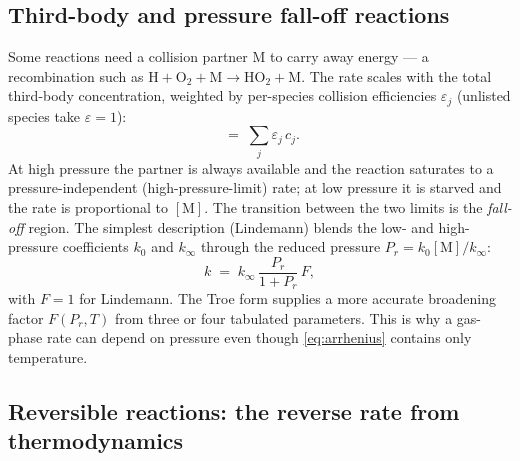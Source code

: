 \documentclass[11pt,a4paper]{article}
\begin{document}
\subsection{Third-body and pressure fall-off reactions}

Some reactions need a collision partner $\mathrm{M}$ to carry away
energy --- a recombination such as $\mathrm{H + O_2 + M \rightarrow HO_2 + M}$.  The
rate scales with the total third-body concentration, weighted by
per-species collision efficiencies $\varepsilon_j$ (unlisted species
take $\varepsilon = 1$):
\begin{equation}
    [\mathrm{M}] \;=\; \sum_j \varepsilon_j\, c_j .
    \label{eq:third-body}
\end{equation}
At high pressure the partner is always available and the reaction
saturates to a pressure-independent (high-pressure-limit) rate; at low
pressure it is starved and the rate is proportional to $[\mathrm{M}]$.
The transition between the two limits is the \emph{fall-off} region.
The simplest description (Lindemann) blends the low- and
high-pressure coefficients $k_0$ and $k_\infty$ through the reduced
pressure $P_r = k_0[\mathrm{M}]/k_\infty$:
\begin{equation}
    k \;=\; k_\infty \,\frac{P_r}{1 + P_r}\, F,
    \label{eq:falloff}
\end{equation}
with $F = 1$ for Lindemann.  The Troe form supplies a more accurate
broadening factor $F(P_r, T)$ from three or four tabulated parameters.
This is why a gas-phase rate can depend on pressure even though
\eqref{eq:arrhenius} contains only temperature.

\subsection{Reversible reactions: the reverse rate from thermodynamics}
\end{document}
